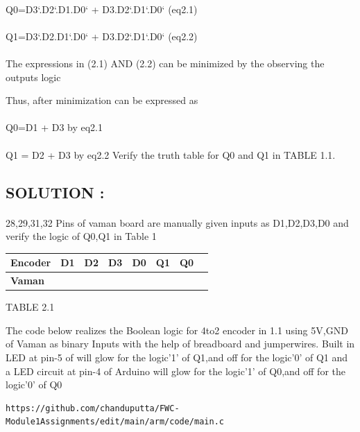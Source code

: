 \documentclass[10pt, a4paper]{article}
\begin{document}
\paragraph{}
{Q0=D3`.D2`.D1.D0` + D3.D2`.D1`.D0`                 (eq2.1)}
\paragraph{}
{Q1=D3`.D2.D1`.D0` + D3.D2`.D1`.D0`                          (eq2.2)}
 
 \paragraph{}
The expressions in (2.1) AND (2.2) can be minimized by the observing the outputs logic

Thus, after minimization  can
be expressed as
\paragraph{}
Q0=D1 + D3    by eq2.1
\paragraph{}  
Q1 = D2 + D3  by eq2.2
\hfill \break
Verify the truth table for Q0 and Q1 in TABLE 1.1.
\hfill \break

\subsection{SOLUTION :}

\paragraph{}
28,29,31,32 Pins of vaman board are manually given inputs as D1,D2,D3,D0 and verify the logic of Q0,Q1 in Table 1

\begin{tabularx}{0.60\textwidth} { 
  | >{\centering\arraybackslash}X 
  | >{\centering\arraybackslash}X 
  | >{\centering\arraybackslash}X 
  | >{\centering\arraybackslash}X 
  | >{\centering\arraybackslash}X 
  | >{\centering\arraybackslash}X
  | >{\centering\arraybackslash}X
  | >{\centering\arraybackslash}X|}

\hline
 \textbf{Encoder} & D1 & D2 & D3 & D0 & Q1 & Q0 \\
\hline
\textbf{Vaman} & 28 & 29 & 31 & 32 & 5 & 4 \\  
\hline
\end{tabularx}
 
\begin{center}
TABLE 2.1
\end{center}

The code below realizes the Boolean logic for 4to2 encoder in 1.1  using 5V,GND of Vaman as binary Inputs with the help of breadboard and jumperwires.
Built in LED at pin-5 of  will glow for the logic'1' of Q1,and off for the logic'0' of Q1  and a LED circuit at pin-4 of Arduino will glow for the logic'1' of Q0,and off for the logic'0' of Q0
\begin{lstlisting}
https://github.com/chanduputta/FWC-Module1Assignments/edit/main/arm/code/main.c
\end{lstlisting}

\end{document}
